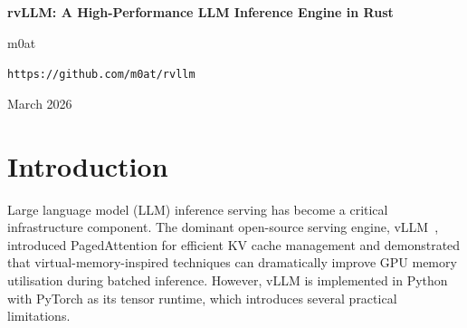 \documentclass[11pt,a4paper]{article}
\begin{document}
\begin{center}
  {\LARGE\bfseries rvLLM: A High-Performance LLM Inference Engine in Rust\par}
  \vspace{0.6em}
  {\large m0at\par}
  \vspace{0.3em}
  {\normalsize\texttt{https://github.com/m0at/rvllm}\par}
  \vspace{0.3em}
  {\normalsize March 2026\par}
\end{center}
\vspace{1em}

\begin{abstract}
We present rvLLM, a from-scratch Rust implementation of the vLLM inference engine
targeting OpenAI-compatible API serving with CUDA GPU acceleration. The system
comprises 22~Rust crates and pre-compiled CUDA PTX kernels, compiling to a single
16\,MB static binary. We describe the modular crate architecture, CUDA integration
strategy via PTX kernels loaded through \texttt{cudarc}, and key design decisions
including a mock-GPU feature for hardware-free development, CPU attention fallback,
and PyTorch weight-layout compatibility. The merged main branch produces coherent
inference output on NVIDIA A100 at 86~tok/s with an 8\,s startup time, 348\,MB
resident memory, and 6.4\,GB VRAM---compared to Python vLLM~0.18's 200~tok/s with
121\,s startup and 1{,}033\,MB RSS. The throughput gap is primarily due to continuous
batching not yet being enabled. rvLLM is open-source under the Apache-2.0 license.
\end{abstract}

\section{Introduction}
\label{sec:introduction}

Large language model (LLM) inference serving has become a critical infrastructure
component. The dominant open-source serving engine, vLLM~\cite{kwon2023vllm},
introduced PagedAttention for efficient KV cache management and demonstrated that
virtual-memory-inspired techniques can dramatically improve GPU memory utilisation
during batched inference. However, vLLM is implemented in Python with PyTorch as its
tensor runtime, which introduces several practical limitations.
\end{document}
